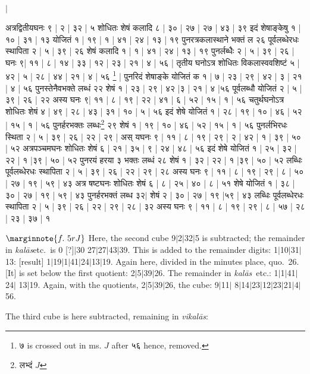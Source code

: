 \documentclass[12pt]{book}
\def\kalas{\textit{ka\-l\=as}}
\def\vikalas{\textit{vi\-ka\-l\=as}}
\def\danda{$|$}
\begin{document}
{\s $|$ 


अत्रद्वितीयघनः ९ | २ | ३२ | ५ शोधितः शेषं कलादि ८ | ३० | २७ | २७ | ४३ | ३९ इदं शेषाङ्केषु १ |
१० | ३१ | १३ योजितं १ | १९ | १ | ४१ | २४ | १३ | १९ पुनरत्रकलास्थाने भक्तं ल २६ पूर्वलब्धेरधः
स्थापिता २ | ५ | ३९ | २६ शेषं कलादि १ | १ | ४१ | २४ | १३ | १९ पुनर्लब्धैः २ | ५ | ३९ | २६ | घनः ९| ११ |
८ | १४ | ३३ | १२ | २३ | २१ | ४ | ५६ | 
तृतीय घनोऽत्र शोधितः विकलास्ववशिष्टं ५ | ४२ | ५ | २८ | ४४ | २१ | ४ |
५६ \footnote{{\s ७} is crossed out in ms. $J$ after {\s ५६} hence, removed.} | पुनरिदं शेषाङ्के योजितं क १ | ७ | २३ | २९ | ४२ | ३ | २१ | ४ | ५६ पुनस्तेनैवभक्ते लब्धं
२२ शेषं १ | २३ | २९ | ४२ |३ | २१ | ४ |५६ पूर्वलब्धौ योजितं २ | ५ | ३९ | २६ | २२ अस्य घनः ९| ११ | ८ |
१९ | २२ | ४१ | ६ | ५२ | १५ | १ | ५६ चतुर्थघनोऽत्र शोधितः शेषं ४ | ४९ | २८ | ४३ | ३१ | १० | ५ | ५६ इदं
शेषे योजितं १ | २८ | १९ | १० | ४६ | ५२ | १५ | १ | ५६ पुनर्हरभक्तः लब्धः\footnote{{\s लभ्दं} $J$} २९ शेषं १ | १९ | १० | ४६
| ५२ | १५ | १ | ५६ पुनर्लभिरधः स्थिता २ | ५ | ३९ | २६ | २२ | २९ | अस् यघनः ९ | ११ | ८ | १९ | २९ | २ | ४२ | १
| ३९ | ५० | ५२ अत्रपञ्चमघनः शोधितः शेषं ६ | २१ | ३५ | ९ | २४ | ४८ | ५६ इदं शेषे योजितं
१ | २५ | ३२ | २२ | १ |३९ | ५० | ५२ पुनरयं हरया ३ भक्तः लब्धं २८ शेषं १ | ३२ | २२ | १ |३९ | ५० |
५२ लब्धिः पूर्वलब्धेरधः स्थापिता २ | ५ | ३९ | २६ | २२ | २९ | २८ अस्य घनः ९ | ११ | ८ | १९ | २९ | ८ | ५०
| २७ | १९ | ५९ | ४३ अत्र षष्टघनः शोधितः शेषं ६ | ८ | २५ | ४० | ८ | ५१ शेषे योजितं १ | ३८ | ३० |
२७ | १९ | ५९ | ४३ पुनर्हरभक्तं लब्ध ३२$|$
शेषं २ | ३० | २७ | १९ |५९ | ४३ लब्धिः पूर्वलब्धेरधः
स्थापिता २ | ५ | ३९ | २६ | २२ | २९ | २८ | ३२ अस्य घनः ९ | ११ | ८ | १९ | २९ | ८ | ५७ | २८ | २३ | ३७ | १}

\newpage

$\marginnote{f.~5r J}$
Here, the second cube 9\danda 2\danda 32\danda 5 is subtracted; the remainder in \kalas etc.\ 
is 0 [?]\danda 30 27\danda 27\danda 43\danda 39. This is added to the remainder digits:
1\danda 10\danda 31\danda 13: [result] 1\danda 19\danda 1\danda 41\danda 24\danda 13\danda 19.
Again here, divided in the minutes place, quo.\ 26. [It] is set below the first quotient: 
2\danda 5\danda 39\danda 26. The remainder in \kalas\ etc.: 1\danda 1\danda 41\danda 24\danda
13\danda 19. Again, with the quotients, 2\danda 5\danda 39\danda 26, the cube: 9\danda 11\danda
8\danda 14\danda 23\danda 12\danda 23\danda 21\danda 4\danda 56.

The third cube is here subtracted, remaining in \vikalas: 
\end{document}
